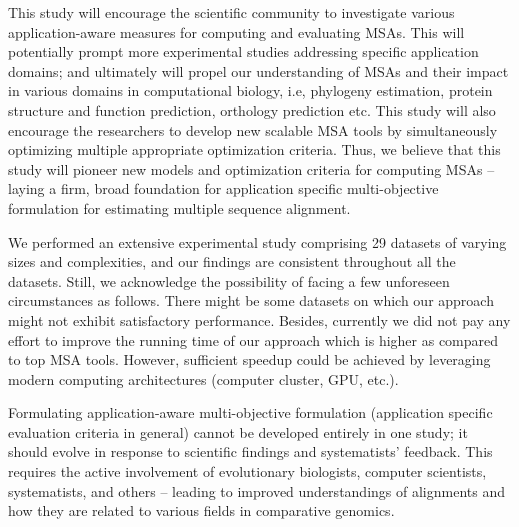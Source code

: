 This study will encourage the scientific community to investigate various application-aware measures for computing and evaluating MSAs. This will potentially prompt more experimental studies addressing specific application domains; and ultimately will propel our understanding of MSAs and their impact in various domains in computational biology, i.e, phylogeny estimation, protein structure and function prediction, orthology prediction etc. This study will also encourage the researchers to develop new scalable MSA tools by simultaneously optimizing multiple appropriate optimization criteria. Thus, we believe that this study will pioneer new models and optimization criteria for computing MSAs -- laying a firm, broad foundation for application specific multi-objective formulation for estimating multiple sequence alignment.

We performed an extensive experimental study comprising 29 datasets of varying sizes and complexities, and our findings are consistent throughout all the datasets. Still, we acknowledge the possibility of facing a few unforeseen circumstances as follows. There might be some datasets on which our approach might not exhibit satisfactory performance. Besides, currently we did not pay any effort to improve the running time of our approach which is higher as compared to top MSA tools. However, sufficient speedup could be achieved by leveraging modern computing architectures (computer cluster, GPU, etc.). 

Formulating application-aware multi-objective formulation (application specific evaluation criteria in general) cannot be developed entirely in one study; it should evolve in response to scientific findings and systematists' feedback. This requires the active involvement of evolutionary biologists, computer scientists, systematists, and others -- leading to improved understandings of alignments and how they are related to various fields in comparative genomics.

